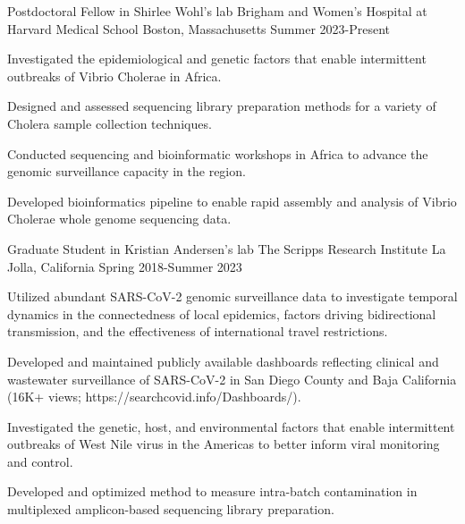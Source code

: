 
\begin{cventries}

  \cventry
    {Postdoctoral Fellow in Shirlee Wohl's lab} %
    {Brigham and Women's Hospital at Harvard Medical School} %
    {Boston, Massachusetts} %
    {Summer 2023-Present} %
    {
      \begin{cvitems} %
        \item {Investigated the epidemiological and genetic factors that enable intermittent outbreaks of Vibrio Cholerae in Africa.}
        \item {Designed and assessed sequencing library preparation methods for a variety of Cholera sample collection techniques.}
        \item {Conducted sequencing and bioinformatic workshops in Africa to advance the genomic surveillance capacity in the region.}
        \item {Developed bioinformatics pipeline to enable rapid assembly and analysis of Vibrio Cholerae whole genome sequencing data.}
      \end{cvitems}
    }

  \cventry
    {Graduate Student in Kristian Andersen's lab} %
    {The Scripps Research Institute} %
    {La Jolla, California} %
    {Spring 2018-Summer 2023} %
    {
      \begin{cvitems} %
        \item {Utilized abundant SARS-CoV-2 genomic surveillance data to investigate temporal dynamics in the connectedness of local epidemics, factors driving bidirectional transmission, and the effectiveness of international travel restrictions.}
        \item {Developed and maintained publicly available dashboards reflecting clinical and wastewater surveillance of SARS-CoV-2 in San Diego County and Baja California (16K+ views; https://searchcovid.info/Dashboards/).}
        \item {Investigated the genetic, host, and environmental factors that enable intermittent outbreaks of West Nile virus in the Americas to better inform viral monitoring and control.}
        \item {Developed and optimized method to measure intra-batch contamination in multiplexed amplicon-based sequencing library preparation.}
      \end{cvitems}
    }


\end{cventries}
